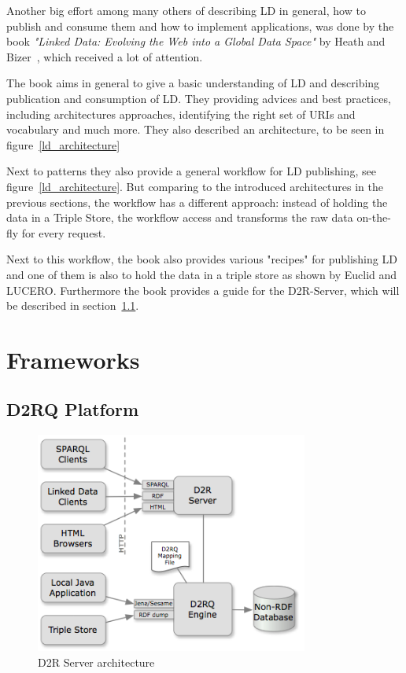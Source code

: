 Another big effort among many others of describing LD in general, how to publish 
and consume them and how to implement applications, was done by the book 
\emph{"Linked Data: Evolving the Web into a Global Data Space"} by Heath and 
Bizer~\cite{heath2011linked}, which received a lot of attention.

The book aims in general to give a basic understanding of LD and describing 
publication and consumption of LD. They providing advices and best practices, 
including architectures approaches, identifying the right set of URIs and 
vocabulary and much more. They also described an architecture, to be seen in 
figure~\ref{ld_architecture}

Next to patterns they also provide a general workflow for LD publishing, see 
figure~\ref{ld_architecture}. But comparing to the introduced architectures in the 
previous sections, the workflow has a different approach: instead of holding the 
data in a Triple Store, the workflow access and transforms the raw data on-the-fly 
for every request.

Next to this workflow, the book also provides various "recipes" for publishing LD 
and one of them is also to hold the data in a triple store as shown by Euclid and 
LUCERO. Furthermore the book provides a guide for the D2R-Server, which will be 
described in section~\ref{d2rq}.

\newpage
\section{Frameworks}

\subsection{D2RQ Platform}\label{d2rq}

\begin{figure}[htbp]
	\centering
\includegraphics[width=0.8\textwidth]{img/d2rq_architecture.png}
	\caption{D2R Server architecture}
	\label{d2rq_architecture}
\end{figure}

